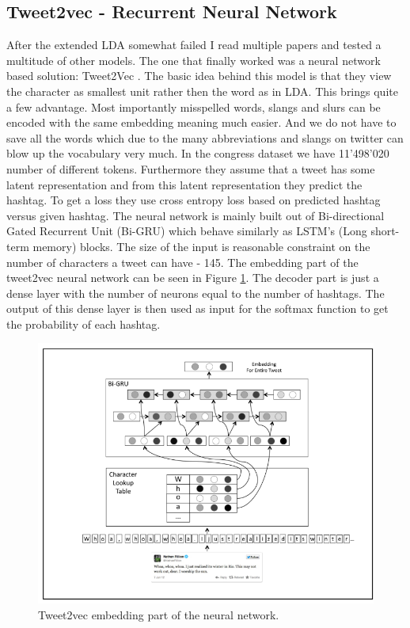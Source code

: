 \documentclass[10pt,conference,compsocconf]{IEEEtran}
\begin{document}
\subsection{Tweet2vec - Recurrent Neural Network}
After the extended LDA somewhat failed I read multiple papers and tested a multitude of other models. The one that finally worked was a neural network based solution: Tweet2Vec \cite{DhingraZFMC16}. The basic idea behind this model is that they view the character as smallest unit rather then the word as in LDA. This brings quite a few advantage. Most importantly misspelled words, slangs and slurs can be encoded with the same embedding meaning much easier. And we do not have to save all the words which due to the many abbreviations and slangs on twitter can blow up the vocabulary very much. In the congress dataset we have 11'498'020 number of different tokens. Furthermore they assume that a tweet has some latent representation and from this latent representation they predict the hashtag. To get a loss they use cross entropy loss based on predicted hashtag versus given hashtag. The neural network is mainly built out of Bi-directional Gated Recurrent Unit (Bi-GRU) which behave similarly as LSTM's (Long short-term memory) blocks. The size of the input is reasonable constraint on the number of characters a tweet can have - 145. The embedding part of the tweet2vec neural network can be seen in Figure \ref{fig:tweet2vecembedding}. The decoder part is just a dense layer with the number of neurons equal to the number of hashtags. The output of this dense layer is then used as input for the softmax function to get the probability of each hashtag. 
\begin{figure}
	\centering
	\includegraphics[width=0.7\linewidth]{images/tweet2vec_embedding}
	\caption{Tweet2vec embedding part of the neural network.}
	\label{fig:tweet2vecembedding}
\end{figure}
\end{document}
